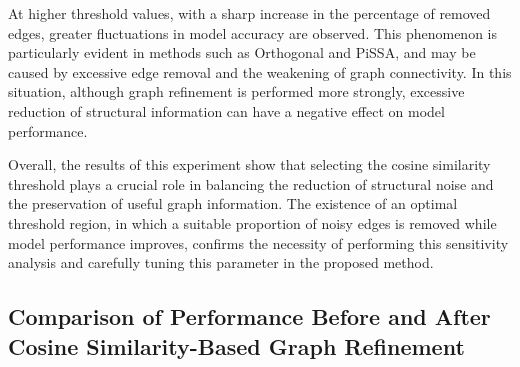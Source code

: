 \documentclass{article}
\begin{document}
At higher threshold values, with a sharp increase in the percentage of removed edges, greater fluctuations in model accuracy are observed. This phenomenon is particularly evident in methods such as Orthogonal and PiSSA, and may be caused by excessive edge removal and the weakening of graph connectivity. In this situation, although graph refinement is performed more strongly, excessive reduction of structural information can have a negative effect on model performance.

Overall, the results of this experiment show that selecting the cosine similarity threshold plays a crucial role in balancing the reduction of structural noise and the preservation of useful graph information. The existence of an optimal threshold region, in which a suitable proportion of noisy edges is removed while model performance improves, confirms the necessity of performing this sensitivity analysis and carefully tuning this parameter in the proposed method.

\subsection{Comparison of Performance Before and After Cosine Similarity-Based Graph Refinement}
\end{document}
